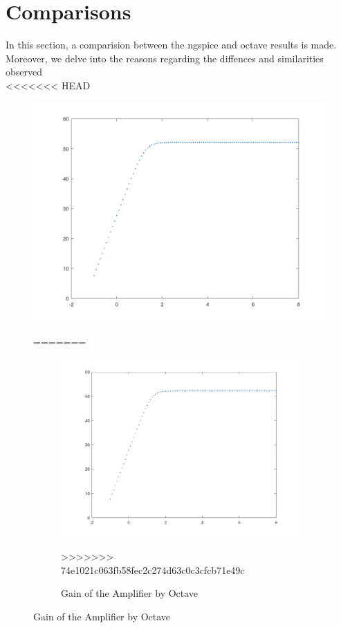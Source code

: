 \section{Comparisons}
\label{sec:comparsisons}

In this section, a comparision between the ngspice and octave results is made. Moreover, we delve into the reasons regarding the diffences and similarities observed\\

<<<<<<< HEAD
\begin{figure} [!htb] 
  \includegraphics[width=\linewidth]{GAINVERDADEIRO.png}
  \caption{Amplifier circuit}
  \label{fig:theoplots}
  \endminipage\hfill
=======
\FloatBarrier
\begin{figure}
  \includegraphics{GAINVERDADEIRO.png}
  \caption{Gain of the Amplifier by Octave}
  \label{}
>>>>>>> 74e1021c063fb58fec2c274d63c0c3cfcb71e49c
\end{figure}


\end{figure}

